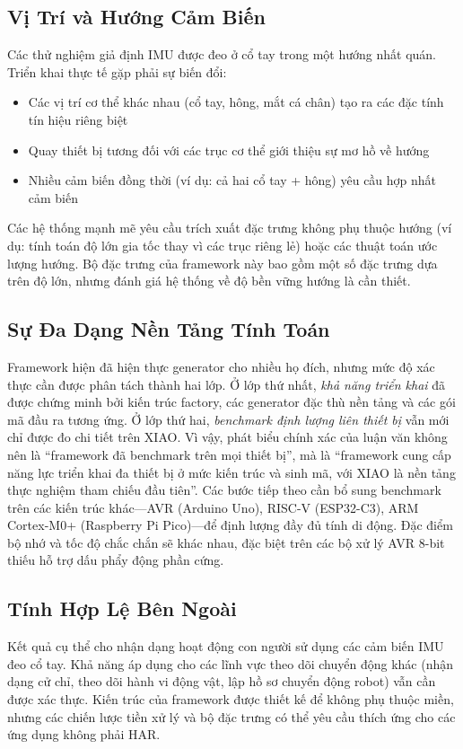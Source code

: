 \subsection{Vị Trí và Hướng Cảm Biến}
Các thử nghiệm giả định IMU được đeo ở cổ tay trong một hướng nhất quán. Triển khai thực tế gặp phải sự biến đổi:
\begin{itemize}
    \item Các vị trí cơ thể khác nhau (cổ tay, hông, mắt cá chân) tạo ra các đặc tính tín hiệu riêng biệt
    \item Quay thiết bị tương đối với các trục cơ thể giới thiệu sự mơ hồ về hướng
    \item Nhiều cảm biến đồng thời (ví dụ: cả hai cổ tay + hông) yêu cầu hợp nhất cảm biến
\end{itemize}

Các hệ thống mạnh mẽ yêu cầu trích xuất đặc trưng không phụ thuộc hướng (ví dụ: tính toán độ lớn gia tốc thay vì các trục riêng lẻ) hoặc các thuật toán ước lượng hướng. Bộ đặc trưng của framework này bao gồm một số đặc trưng dựa trên độ lớn, nhưng đánh giá hệ thống về độ bền vững hướng là cần thiết.

\subsection{Sự Đa Dạng Nền Tảng Tính Toán}
Framework hiện đã hiện thực generator cho nhiều họ đích, nhưng mức độ xác thực cần được phân tách thành hai lớp. Ở lớp thứ nhất, \textit{khả năng triển khai} đã được chứng minh bởi kiến trúc factory, các generator đặc thù nền tảng và các gói mã đầu ra tương ứng. Ở lớp thứ hai, \textit{benchmark định lượng liên thiết bị} vẫn mới chỉ được đo chi tiết trên XIAO. Vì vậy, phát biểu chính xác của luận văn không nên là ``framework đã benchmark trên mọi thiết bị'', mà là ``framework cung cấp năng lực triển khai đa thiết bị ở mức kiến trúc và sinh mã, với XIAO là nền tảng thực nghiệm tham chiếu đầu tiên''. Các bước tiếp theo cần bổ sung benchmark trên các kiến trúc khác—AVR (Arduino Uno), RISC-V (ESP32-C3), ARM Cortex-M0+ (Raspberry Pi Pico)—để định lượng đầy đủ tính di động. Đặc điểm bộ nhớ và tốc độ chắc chắn sẽ khác nhau, đặc biệt trên các bộ xử lý AVR 8-bit thiếu hỗ trợ dấu phẩy động phần cứng.

\subsection{Tính Hợp Lệ Bên Ngoài}
Kết quả cụ thể cho nhận dạng hoạt động con người sử dụng các cảm biến IMU đeo cổ tay. Khả năng áp dụng cho các lĩnh vực theo dõi chuyển động khác (nhận dạng cử chỉ, theo dõi hành vi động vật, lập hồ sơ chuyển động robot) vẫn cần được xác thực. Kiến trúc của framework được thiết kế để không phụ thuộc miền, nhưng các chiến lược tiền xử lý và bộ đặc trưng có thể yêu cầu thích ứng cho các ứng dụng không phải HAR.

